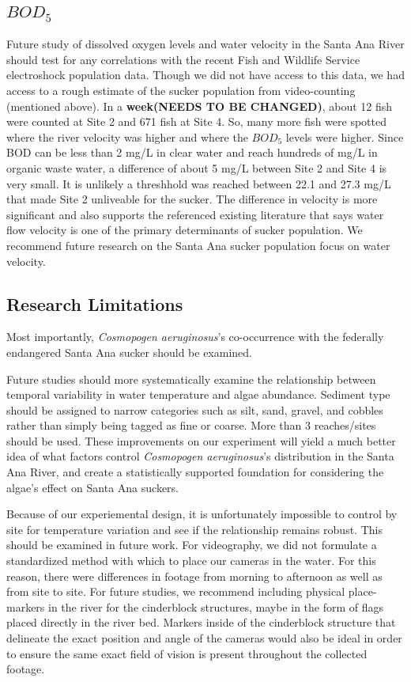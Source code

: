 \documentclass{article}\usepackage[]{graphicx}\usepackage[]{color}
\begin{document}
\subsection{$BOD_5$}
Future study of dissolved oxygen levels and water velocity in the Santa Ana River should test for any correlations with the recent Fish and Wildlife Service electroshock population data. Though we did not have access to this data, we had access to a rough estimate of the sucker population from video-counting (mentioned above). In a \textbf{week(NEEDS TO BE CHANGED)}, about 12 fish were counted at Site 2 and 671 fish at Site 4. So, many more fish were spotted where the river velocity was higher and where the $BOD_5$ levels were higher. Since BOD can be less than 2 mg/L in clear water and reach hundreds of mg/L in organic waste water, a difference of about 5 mg/L between Site 2 and Site 4 is very small. It is unlikely a threshhold was reached between 22.1 and 27.3 mg/L that made Site 2 unliveable for the sucker. The difference in velocity is more significant and also supports the referenced existing literature that says water flow velocity is one of the primary determinants of sucker population. We recommend future research on the Santa Ana sucker population focus on water velocity.

\subsection{Research Limitations}

Most importantly, \emph{Cosmopogen aeruginosus}'s co-occurrence with the federally endangered Santa Ana sucker should be examined. 

Future studies should more systematically examine the relationship between temporal variability in water temperature and algae abundance. Sediment type should be assigned to narrow categories such as silt, sand, gravel, and cobbles rather than simply being tagged as fine or coarse. More than 3 reaches/sites should be used. 
These improvements on our experiment will yield a much better idea of what factors control \emph{Cosmopogen aeruginosus}'s distribution in the Santa Ana River, and create a statistically supported foundation for considering the algae's effect on Santa Ana suckers.

Because of our experiemental design, it is unfortunately impossible to control by site for temperature variation and see if the relationship remains robust. This should be examined in future work. For videography, we did not formulate a standardized method with which to place our cameras in the water. For this reason, there were differences in footage from morning to afternoon as well as from site to site. For future studies, we recommend including physical place-markers in the river for the cinderblock structures, maybe in the form of flags placed directly in the river bed. Markers inside of the cinderblock structure that delineate the exact position and angle of the cameras would also be ideal in order to ensure the same exact field of vision is present throughout the collected footage. 
\end{document}
